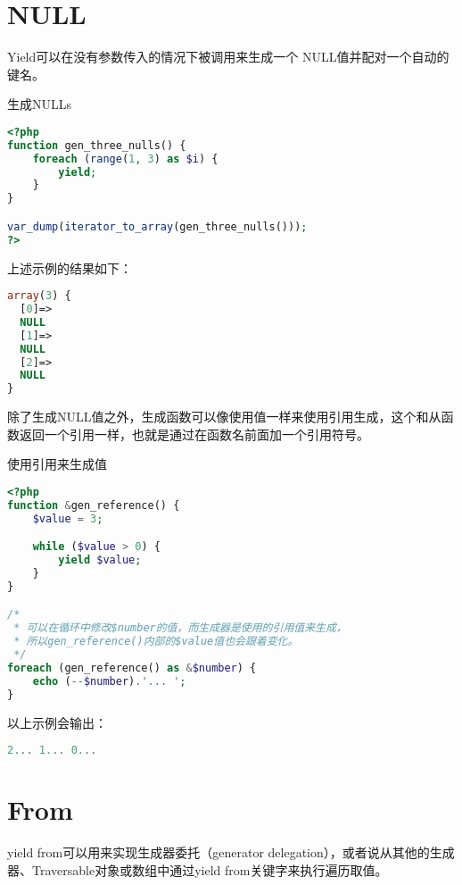 \section{NULL}


Yield可以在没有参数传入的情况下被调用来生成一个 NULL值并配对一个自动的键名。



\begin{example}
生成NULLs
\begin{lstlisting}[language=PHP]
<?php
function gen_three_nulls() {
    foreach (range(1, 3) as $i) {
        yield;
    }
}

var_dump(iterator_to_array(gen_three_nulls()));
?>
\end{lstlisting}
\end{example}

上述示例的结果如下：


\begin{lstlisting}[language=PHP]
array(3) {
  [0]=>
  NULL
  [1]=>
  NULL
  [2]=>
  NULL
}
\end{lstlisting}

除了生成NULL值之外，生成函数可以像使用值一样来使用引用生成，这个和从函数返回一个引用一样，也就是通过在函数名前面加一个引用符号。




\begin{example}
使用引用来生成值
\begin{lstlisting}[language=PHP]
<?php
function &gen_reference() {
    $value = 3;

    while ($value > 0) {
        yield $value;
    }
}

/* 
 * 可以在循环中修改$number的值，而生成器是使用的引用值来生成，
 * 所以gen_reference()内部的$value值也会跟着变化。
 */
foreach (gen_reference() as &$number) {
    echo (--$number).'... ';
}
\end{lstlisting}
\end{example}

以上示例会输出：

\begin{lstlisting}[language=PHP]
2... 1... 0... 
\end{lstlisting}


\section{From}

yield from可以用来实现生成器委托（generator delegation），或者说从其他的生成器、Traversable对象或数组中通过yield from关键字来执行遍历取值。



